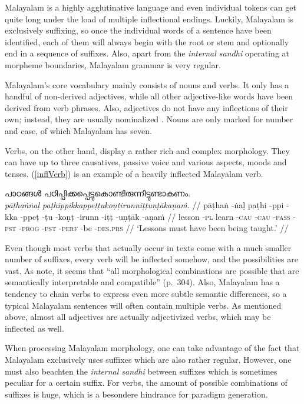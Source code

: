 \documentclass[a4paper]{article}
\newcommand{\afx}[1]{\textsc{#1}}
\begin{document}
Malayalam is a highly agglutinative language and even individual tokens can get quite long under the load of multiple inflectional endings. Luckily, Malayalam is exclusively suffixing, so once the individual words of a sentence have been identified, each of them will always begin with the root or stem and optionally end in a sequence of suffixes. Also, apart from the \textit{internal sandhi} operating at morpheme boundaries, Malayalam grammar is very regular.

Malayalam's core vocabulary mainly consists of nouns and verbs. It only has a handful of non-derived adjectives, while all other adjective-like words have been derived from verb phrases. Also, adjectives do not have any inflections of their own; instead, they are usually nominalized \parencite[p.~349ff]{asherKumari}. Nouns are only marked for number and case, of which Malayalam has seven.

Verbs, on the other hand, display a rather rich and complex morphology. They can have up to three causatives, passive voice and various aspects, moods and tenses. (\ref{inflVerb}) is an example of a heavily inflected Malayalam verb.

\ex\label{inflVerb}\begingl[everygla=\itshape]
\glpreamble പാഠങ്ങൾ പഠിപ്പിക്കപ്പെട്ടുകൊണ്ടിരുന്നിട്ടുണ്ടാകണം. \\
\textit{pāṭhaṅṅaḷ paṭhippikkappeṭṭukoṇṭirunniṭṭuṇṭākaṇaṁ.} //
\gla pāṭhaṅ -ṅaḷ {} paṭhi -ppi -kka -ppeṭ -ṭu -koṇṭ -irunn -iṭṭ -uṇṭāk -aṇaṁ //
\glc lesson -\afx{pl} {} learn -\afx{cau} -\afx{cau} -\afx{pass} -\afx{pst} -\afx{prog} -\afx{pst} -\afx{perf} -be -\afx{des.prs} //
\glft `Lessons must have been being taught.' \parencite[p.~304]{asherKumari} //
\endgl\xe

Even though most verbs that actually occur in texts come with a much smaller number of suffixes, every verb will be inflected somehow, and the possibilities are vast. As \textcite{asherKumari} note, it seems that ``all morphological combinations are possible that are semantically interpretable and compatible'' (p.~304). Also, Malayalam has a tendency to chain verbs to express even more subtle semantic differences, so a typical Malayalam sentences will often contain multiple verbs. As mentioned above, almost all adjectives are actually adjectivized verbs, which may be inflected as well.

When processing Malayalam morphology, one can take advantage of the fact that Malayalam exclusively uses suffixes which are also rather regular. However, one must also beachten the \textit{internal sandhi} between suffixes which is sometimes peculiar for a certain suffix. For verbs, the amount of possible combinations of suffixes is huge, which is a besondere hindrance for paradigm generation.
\end{document}
